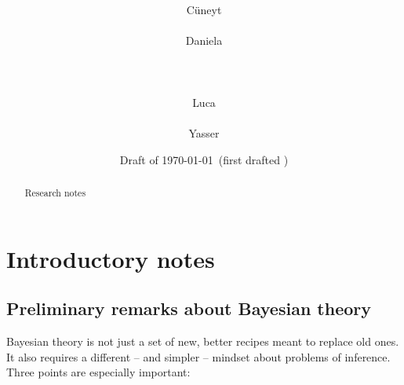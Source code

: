 \documentclass[\ifafour a4paper,12pt,\else a5paper,10pt,\fi%
onecolumn,oneside,article,%
british%
]{memoir}
\title{\propertitle%
}
\author{%
\hspace*{\stretch{1}}%
\parbox{0.5\linewidth}%
{\protect\centering C\"uneyt\\%
\footnotesize\epost{\email{cuneyt.guzey}{ntnu.no}}}%
\hspace*{\stretch{1}}%
\parbox{0.5\linewidth}%
{\protect\centering Daniela\\%
\footnotesize\epost{\email{daniela.bragantini}{ntnu.no}}}%
\hspace*{\stretch{1}}%
\\[\jot]\hspace*{\stretch{1}}%
\parbox{0.5\linewidth}%
{\protect\centering Luca\\%
\footnotesize\epost{\email{piero.mana}{ntnu.no}}}%
\hspace*{\stretch{1}}%
\parbox{0.5\linewidth}%
{\protect\centering Yasser\\%
\footnotesize\epost{\email{yasser.roudi}{ntnu.no}}}%
\hspace*{\stretch{1}}%
}
\date{Draft of \today\ (first drafted \firstdraft)}
\theoremstyle{remark}
\theoremstyle{innote}
\newcommand*{\asudedication}[1]{%
{\par\centering\textit{#1}\par}}
\renewcommand*{\|}{\mathpunct{|}}
\begin{document}
\captiondelim{\quad}\captionnamefont{\footnotesize}\captiontitlefont{\footnotesize}
\frenchspacing

\maketitle
\ifpublic
\abstractrunin
\abslabeldelim{}
\renewcommand*{\abstractname}{}
\setlength{\absleftindent}{0pt}
\setlength{\absrightindent}{0pt}
\setlength{\abstitleskip}{-\absparindent}
\begin{abstract}%
  \noindent Research notes
\end{abstract}\fi

\frenchspacing

\section{Introductory notes}
\label{sec:intro}



\subsection{Preliminary remarks about Bayesian  theory}
\label{sec:prelim_remarks}

Bayesian  theory is not just a set of new, better recipes meant
to replace old ones. It also requires a different -- and simpler -- mindset
about problems of inference. Three points are especially important:
\end{document}
